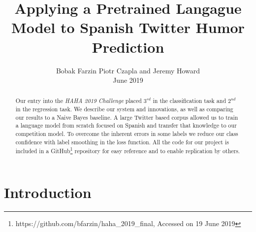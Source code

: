 \documentclass[runningheads]{llncs}
\begin{document}
\title{Applying a Pretrained Langague Model to Spanish Twitter Humor Prediction}
\author{Bobak Farzin  Piotr Czapla  and Jeremy Howard  \\June 2019}
%
%


\maketitle

\begin{abstract}
Our entry into the \textit{HAHA 2019 Challenge} placed $3^{rd}$ in the classification task and $2^{nd}$ in the regression task.  We describe our system and innovations, as well as comparing our results to a Naive Bayes baseline.
A large Twitter based corpus allowed us to train a language model from scratch focused on Spanish and transfer that knowledge to our competition model.  To overcome the inherent errors in some labels we reduce our class confidence with label smoothing in the loss function.
All the code for our project is included in a GitHub\footnote{https://github.com/bfarzin/haha\_2019\_final, Accessed on 19 June 2019} repository for easy reference and to enable replication by others.

\end{abstract}

\section{Introduction}
\label{intro}
\newcommand{\chapquote}[3]{\begin{quotation} \textit{#1} \end{quotation} \begin{flushright} - #2, \textit{#3}\end{flushright} }
\end{document}
